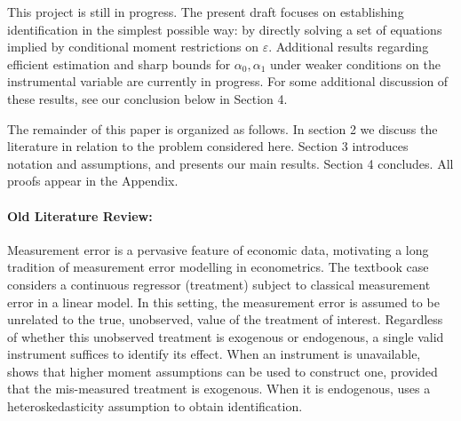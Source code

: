 This project is still in progress. 
The present draft focuses on establishing identification in the simplest possible way: by directly solving a set of equations implied by conditional moment restrictions on $\varepsilon$.
Additional results regarding efficient estimation and sharp bounds for $\alpha_0, \alpha_1$ under weaker conditions on the instrumental variable are currently in progress.
For some additional discussion of these results, see our conclusion below in Section 4.

The remainder of this paper is organized as follows. 
In section 2 we discuss the literature in relation to the problem considered here. 
Section 3 introduces notation and assumptions, and presents our main results.
Section 4 concludes.
All proofs appear in the Appendix.

\paragraph{Old Literature Review:}
Measurement error is a pervasive feature of economic data, motivating a long tradition of measurement error modelling in econometrics. 
The textbook case considers a continuous regressor (treatment) subject to classical measurement error in a linear model.
In this setting, the measurement error is assumed to be unrelated to the true, unobserved, value of the treatment of interest.
Regardless of whether this unobserved treatment is exogenous or endogenous, a single valid instrument suffices to identify its effect.
When an instrument is unavailable, \cite{lewbel1997} shows that higher moment assumptions can be used to construct one, provided that the mis-measured treatment is exogenous.
When it is endogenous, \cite{lewbel2012} uses a heteroskedasticity assumption to obtain identification.

